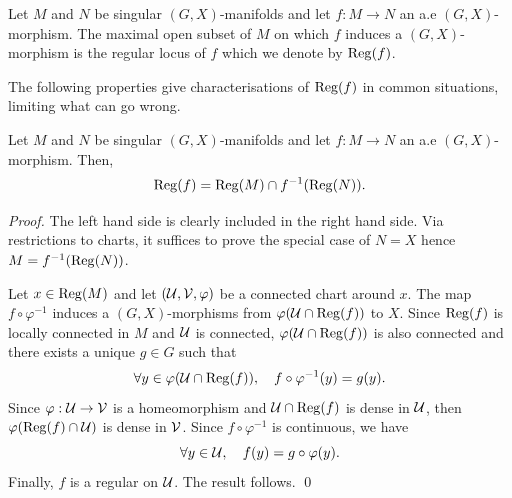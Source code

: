                 \begin{defi} Let $M$ and $N$ be singular $(G,X)$-manifolds and let $f:M\rightarrow N$ an a.e $(G,X)$-morphism.
                The maximal open subset of $M$ on which $f$ induces a $(G,X)$-morphism is the regular locus of $f$ which we denote by $\mathrm{Reg}(f)$.
                \end{defi}

                The following properties give characterisations of $\mathrm{Reg}(f)$ in common situations, limiting what can go wrong.
                    \begin{lem}\label{lem:regf1}
                     Let $M$ and $N$ be  singular $(G,X)$-manifolds and let $f:M\rightarrow N$ an a.e $(G,X)$-morphism. Then, 
                     $$\mathrm{Reg}(f)=\mathrm{Reg}(M)\cap f^{-1}(\mathrm{Reg}(N)).$$
                    \end{lem}
                    \begin{proof}
                     The left hand side is clearly included in the right hand side.                   
                     Via restrictions to charts, it suffices to prove the special case of $N=X$ hence $M=f^{-1}(\mathrm{Reg}(N))$.
                    
                     Let $x\in \mathrm{Reg}(M)$ and let $(\mathcal{U},\mathcal V,\varphi)$ be a connected chart around $x$. The map $f\circ\varphi^{-1}$ induces a $(G,X)$-morphisms from $\varphi(\mathcal{U}\cap\mathrm{Reg}(f))$ to $X$. Since $\mathrm{Reg}(f)$ is locally connected in $M$ and $\mathcal{U}$ is connected, $\varphi(\mathcal{U}\cap\mathrm{Reg}(f))$ is also connected and there exists a unique $g\in G$ such that $$\forall y\in \varphi(\mathcal{U}\cap\mathrm{Reg}(f)),\quad  f\circ \varphi^{-1}(y)=g(y).$$
                     Since $\varphi:\mathcal{U}\rightarrow \mathcal V$ is a homeomorphism and $\mathcal{U}\cap\mathrm{Reg}(f)$ is dense in $\mathcal{U}$, then  $\varphi(\mathrm{Reg}(f)\cap \mathcal{U})$ is dense in $\mathcal V$. Since $f\circ \varphi^{-1}$ is continuous, we have
                     $$\forall y\in \mathcal{U},\quad  f(y)=g\circ \varphi(y).$$
                     Finally, $f$ is a regular on $\mathcal{U}$. The result follows.
                    \qed\end{proof}
       

